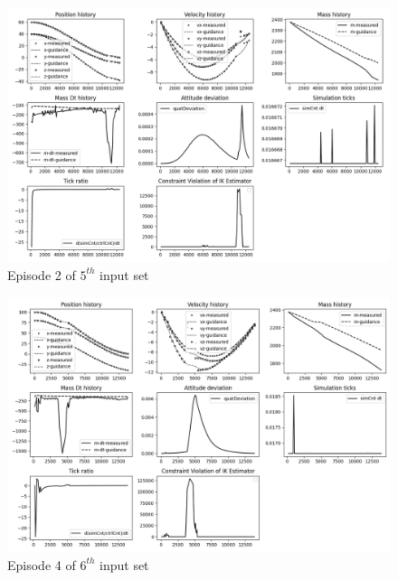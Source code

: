 \documentclass[10pt]{elsarticle}
\begin{document}
\begin{figure}[!htb]   
   \begin{minipage}{0.95\textwidth}
     \centering
     \includegraphics[width=1.0\linewidth]{is5_ep02}
     \vspace*{2mm}
     \caption{Episode 2 of $5^{th}$ input set}
     \label{fig:is5_ep02}
   \end{minipage}
\end{figure}

\begin{figure}[!htb]   
   \begin{minipage}{0.95\textwidth}
     \centering
     \includegraphics[width=1.0\linewidth]{is6_ep04}
     \vspace*{2mm}
     \caption{Episode 4 of $6^{th}$ input set}
     \label{fig:is6_ep04}
   \end{minipage}
\end{figure}
\end{document}
